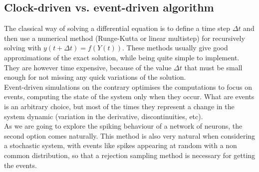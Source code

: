 \subsection{Clock-driven vs. event-driven algorithm}
	\indent The classical way of solving a differential equation is to define a time step $\Delta t$ and then use a numerical method (Runge-Kutta or linear multistep) for recursively solving with $y(t+\Delta t)=f(Y(t))$. These methods usually give good approximations of the exact solution, while being quite simple to implement. They are however time expensive, because of the value $\Delta t$ that must be small enough for not missing any quick variations of the solution.\\\indent
	Event-driven simulations on the contrary optimises the computations to focus on events, computing the state of the system only when they occur. What are events is an arbitrary choice, but most of the times they represent a change in the system dynamic (variation in the derivative, discontinuities, etc).\\\indent
	As we are going to explore the spiking behaviour of a network of neurons, the second option comes naturally. This method is also very natural when considering a stochastic system, with events like spikes appearing at random with a non common distribution, so that a rejection sampling method is necessary for getting the events.\\\indent
